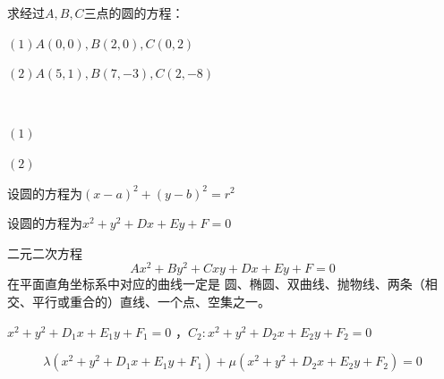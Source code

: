 \begin{example}
    求经过\(A,B,C\)三点的圆的方程：

    \((1)A(0,0),B(2,0),C(0,2)\)

    \((2)A(5,1),B(7,-3),C(2,-8)\)
\end{example}
\begin{jie}
    \ 

    $(1)$

    \((2)\)
    \begin{way1}
        
    \end{way1}
    \begin{way2}
        设圆的方程为\((x-a)^2+(y-b)^2=r^2\)
    \end{way2}
    \begin{way3}
        设圆的方程为\(x^2+y^2+Dx+Ey+F=0\)
    \end{way3}
\end{jie}
\begin{theorem}
    二元二次方程\begin{equation}
        Ax^2+By^2+Cxy+Dx+Ey+F=0
    \end{equation}
    在平面直角坐标系中对应的曲线一定是
    圆、椭圆、双曲线、抛物线、两条（相交、平行或重合的）直线、一个点、空集之一。
\end{theorem}
\begin{theorem}
    $x^{2}+y^{2}+D_{1} x+E_{1} y+F_{1}=0$ ，$C_{2}: x^{2}+y^{2}+D_{2} x+E_{2} y+F_{2}=0$

    \begin{equation}
        \lambda(x^{2}+y^{2}+D_{1} x+E_{1} y+F_{1})+\mu(x^{2}+y^{2}+D_{2} x+E_{2} y+F_{2})=0
    \end{equation}
\end{theorem}
\clearpage

